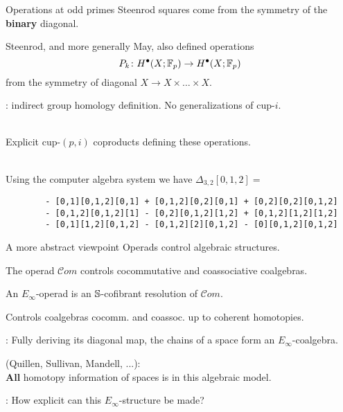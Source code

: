
\begin{frame}[fragile]{Operations at odd primes}
	\pause
	Steenrod squares come from the symmetry of the \textbf{binary} diagonal.

	\medskip\pause
	Steenrod, and more generally May, also defined operations
	\[
	P_k \colon H^\bullet(X; {\mathbb{F}_p}) \to H^\bullet(X; {\mathbb{F}_p})
	\]
	from the symmetry of diagonal $X \to X \times \dots \times X$.

	\medskip\pause
	: indirect group homology definition.
	No generalizations of cup-$i$.

	\bigskip\pause
	 \\
	Explicit cup-$(p,i)$ coproducts defining these operations.

	\medskip\pause
	 \\
	Using the computer algebra system  we have $\Delta_{3,2}[0,1,2] = $

	\begin{verbatim}
		- [0,1][0,1,2][0,1] + [0,1,2][0,2][0,1] + [0,2][0,2][0,1,2]
		- [0,1,2][0,1,2][1] - [0,2][0,1,2][1,2] + [0,1,2][1,2][1,2]
		- [0,1][1,2][0,1,2] - [0,1,2][2][0,1,2] - [0][0,1,2][0,1,2]
	\end{verbatim}
\end{frame}

\begin{frame}{A more abstract viewpoint}
	\pause
	Operads control algebraic structures.

	\bigskip\pause
	The operad $\mathcal{C}om$ controls cocommutative and coassociative coalgebras.

	\bigskip\pause
	An $E_\infty$-operad is an $\mathbb{S}$-cofibrant resolution of $\mathcal{C}om$.

	\bigskip\pause
	Controls coalgebras cocomm. and coassoc. up to coherent homotopies.


	\bigskip\pause
	:
	Fully deriving its diagonal map, the chains of a space form an $E_\infty$-coalgebra.

	\bigskip\pause
	 (Quillen, Sullivan, Mandell, ...): \\
	\textbf{All} homotopy information of spaces is in this algebraic model.

	\bigskip\pause
	: How explicit can this $E_\infty$-structure be made?
\end{frame}

